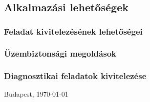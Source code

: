 \chapter{\osszefoglalas} %

\section{Alkalmazási lehetőségek}

\subsection{Feladat kivitelezésének lehetőségei}

\subsection{Üzembiztonsági megoldások}

\subsection{Diagnosztikai feladatok kivitelezése}

%
%

\vspace{0.5cm}

\begin{flushleft}
{Budapest, \today}
\end{flushleft}

\begin{flushright}
\emph{\authorName}
\end{flushright}

\vfill
